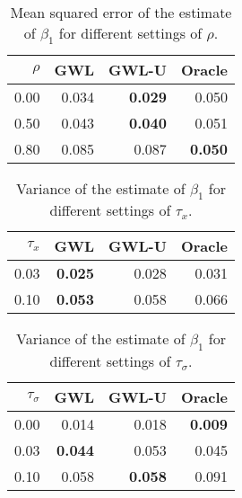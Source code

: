 \documentclass[authoryear, review, 11pt]{elsarticle}
\begin{document}
\begin{table}[ht]
\begin{center}
\begin{tabular}{rrrr}
 $\rho$ & GWL & GWL-U & Oracle \\ 
  \hline
0.00 & 0.034 & \textbf{0.029} & 0.050 \\ 
  0.50 & 0.043 & \textbf{0.040} & 0.051 \\ 
  0.80 & 0.085 & 0.087 & \textbf{0.050} \\ 
  \end{tabular}
\caption{Mean squared error of the estimate of $\beta_1$ for different settings of $\rho$.}
\end{center}
\end{table}

\begin{table}[ht]
\begin{center}
\begin{tabular}{rrrr}
 $\tau_x$ & GWL & GWL-U & Oracle \\ 
  \hline
0.03 & \textbf{0.025} & 0.028 & 0.031 \\ 
  0.10 & \textbf{0.053} & 0.058 & 0.066 \\ 
  \end{tabular}
\caption{Variance of the estimate of $\beta_1$ for different settings of $\tau_x$.}
\end{center}
\end{table}

\begin{table}[ht]
\begin{center}
\begin{tabular}{rrrr}
 $\tau_\sigma$ & GWL & GWL-U & Oracle \\ 
  \hline
0.00 & 0.014 & 0.018 & \textbf{0.009} \\ 
  0.03 & \textbf{0.044} & 0.053 & 0.045 \\ 
  0.10 & 0.058 & \textbf{0.058} & 0.091 \\ 
  \end{tabular}
\caption{Variance of the estimate of $\beta_1$ for different settings of $\tau_\sigma$.}
\end{center}
\end{table}
\end{document}
